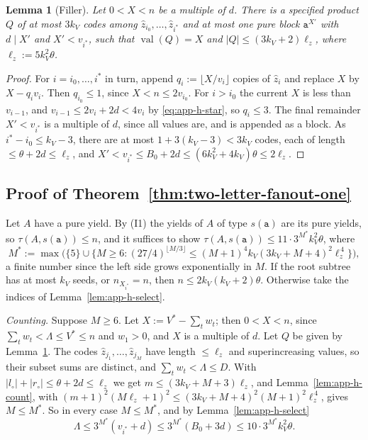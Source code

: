 \documentclass[11pt]{article}
\numberwithin{equation}{section}
\theoremstyle{plain}
\newtheorem{lemma}[theorem]{Lemma}
\theoremstyle{definition}
\theoremstyle{remark}
\theoremstyle{plain}
\begin{document}
\begin{lemma}[Filler]
\label{lem:app-h-filler}
Let $0<X<n$ be a multiple of $d$.  There is a specified product $Q$ of at most
$3k_V$ codes among $\hat z_{i_0},\ldots,\hat z_{i^*}$ and at most one pure block
$\mathtt a^{X'}$ with $d\mid X'$ and $X'<v_{i^*}$, such that
$\operatorname{val}(Q)=X$ and $|Q|\le(3k_V+2)\ell_z$, where
$\ell_z:=5k_V^2\theta$.
\end{lemma}

\begin{proof}
For $i=i_0,\ldots,i^*$ in turn, append $q_i:=\lfloor X/v_i\rfloor$ copies of
$\hat z_i$ and replace $X$ by $X-q_iv_i$.  Then $q_{i_0}\le1$, since
$X<n\le2v_{i_0}$.  For $i>i_0$ the current $X$ is less than $v_{i-1}$, and
$v_{i-1}\le2v_i+2d<4v_i$ by \eqref{eq:app-h-star}, so $q_i\le3$.  The final
remainder $X'<v_{i^*}$ is a multiple of $d$, since all values are, and is
appended as a block.  As $i^*-i_0\le k_V-3$, there are at most
$1+3(k_V-3)<3k_V$ codes, each of length $\le\theta+2d\le\ell_z$, and
$X'<v_{i^*}\le B_0+2d\le(6k_V^2+4k_V)\theta\le2\ell_z$.
\end{proof}

\subsection{Proof of Theorem~\ref{thm:two-letter-fanout-one}}

Let $A$ have a pure yield.  By (I1) the yields of $A$ of type $s(\mathtt a)$
are its pure yields, so $\tau(A,s(\mathtt a))\le n$, and it suffices to show
$\tau(A,s(\mathtt a))\le11\cdot3^{M^*}k_V^2\theta$, where
\[
 M^*:=\max\bigl(\{5\}\cup\{M\ge6:(27/4)^{\lfloor M/3\rfloor}
 \le(M+1)^4k_V(3k_V+M+4)^2\ell_z^{\,4}\}\bigr),
\]
a finite number since the left side grows exponentially in $M$.  If the root
subtree has at most $k_V$ seeds, or $n_{X_{i^*}}=n$, then $n\le2k_V(k_V+2)\theta$.
Otherwise take the indices of Lemma~\ref{lem:app-h-select}.

\emph{Counting.}  Suppose $M\ge6$.  Let $X:=V^*-\sum_tw_t$; then $0<X<n$, since
$\sum_tw_t<\Lambda\le V^*\le n$ and $w_1>0$, and $X$ is a multiple of $d$.  Let
$Q$ be given by Lemma~\ref{lem:app-h-filler}.  The codes $\hat z_{j_1},\ldots,\hat
z_{j_M}$ have length $\le\ell_z$ and superincreasing values, so their subset
sums are distinct, and $\sum_tw_t<\Lambda\le D$.  With
$|l_\circ|+|r_\circ|\le\theta+2d\le\ell_z$ we get
$m\le(3k_V+M+3)\ell_z$, and Lemma~\ref{lem:app-h-count}, with
$(m+1)^2(M\ell_z+1)^2\le(3k_V+M+4)^2(M+1)^2\ell_z^{\,4}$, gives $M\le M^*$.  So in
every case $M\le M^*$, and by Lemma~\ref{lem:app-h-select}
\[
 \Lambda\le3^{M^*}(v_{i^*}+d)\le3^{M^*}(B_0+3d)\le10\cdot3^{M^*}k_V^2\theta .
\]
\end{document}

